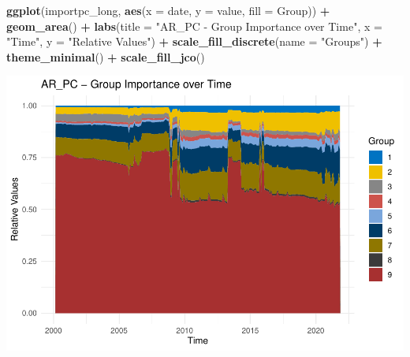 \documentclass[
]{article}
\newenvironment{Shaded}{\begin{snugshade}}{\end{snugshade}}
\newcommand{\AttributeTok}[1]{\textcolor[rgb]{0.13,0.29,0.53}{#1}}
\newcommand{\FunctionTok}[1]{\textcolor[rgb]{0.13,0.29,0.53}{\textbf{#1}}}
\newcommand{\NormalTok}[1]{#1}
\newcommand{\SpecialCharTok}[1]{\textcolor[rgb]{0.81,0.36,0.00}{\textbf{#1}}}
\newcommand{\StringTok}[1]{\textcolor[rgb]{0.31,0.60,0.02}{#1}}
\begin{document}
\begin{Shaded}
\begin{Highlighting}[]
\FunctionTok{ggplot}\NormalTok{(importpc\_long, }\FunctionTok{aes}\NormalTok{(}\AttributeTok{x =}\NormalTok{ date, }\AttributeTok{y =}\NormalTok{ value, }\AttributeTok{fill =}\NormalTok{ Group)) }\SpecialCharTok{+}
  \FunctionTok{geom\_area}\NormalTok{() }\SpecialCharTok{+}
  \FunctionTok{labs}\NormalTok{(}\AttributeTok{title =} \StringTok{"AR\_PC {-} Group Importance over Time"}\NormalTok{, }\AttributeTok{x =} \StringTok{"Time"}\NormalTok{, }\AttributeTok{y =} \StringTok{"Relative Values"}\NormalTok{) }\SpecialCharTok{+}
  \FunctionTok{scale\_fill\_discrete}\NormalTok{(}\AttributeTok{name =} \StringTok{"Groups"}\NormalTok{) }\SpecialCharTok{+}
  \FunctionTok{theme\_minimal}\NormalTok{()  }\SpecialCharTok{+} 
  \FunctionTok{scale\_fill\_jco}\NormalTok{()}
\end{Highlighting}
\end{Shaded}

\includegraphics{Trabalho_Econo4_Q2_files/figure-latex/unnamed-chunk-36-1.pdf}
\end{document}
